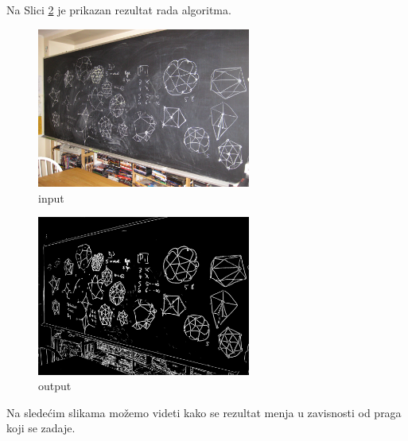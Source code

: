 \documentclass[12pt,a4paper]{article}
\theoremstyle{definition}
\theoremstyle{remark}
\theoremstyle{plain}
\begin{document}
\inputminted[tabsize=2,breaklines]{cpp}{codes/latex/edge_detection.cpp}

Na Slici \ref{fed_result} je prikazan rezultat rada algoritma.

\begin{multicols}{2}
\begin{figure}[H]
\centering
\includegraphics[width=7cm]{images/blackboard.jpg}
  \caption{input}\label{blackboard_fed_input}
\end{figure}
\columnbreak
\begin{figure}[H]
\centering
\includegraphics[width=7cm]{images/blackboard_35.png}
  \caption{output}\label{fed_result}
\end{figure}
\end{multicols}

Na slede\' cim slikama mo\v zemo videti kako se rezultat menja u zavisnosti od praga koji se zadaje.
\end{document}
